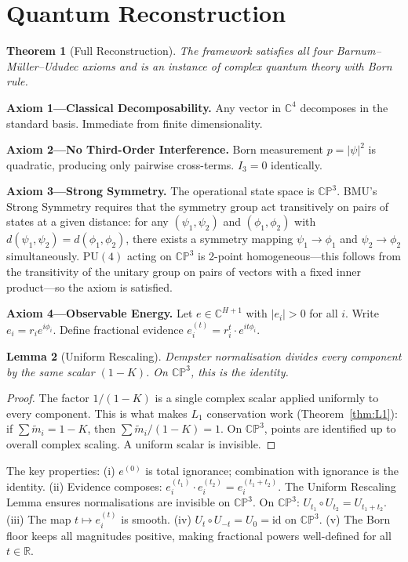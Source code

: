 \documentclass[11pt,a4paper]{article}
\newtheorem{theorem}{Theorem}[section]
\newtheorem{lemma}[theorem]{Lemma}
\theoremstyle{definition}
\theoremstyle{remark}
\newcommand{\CP}{\mathbb{CP}}
\newcommand{\C}{\mathbb{C}}
\newcommand{\R}{\mathbb{R}}
\begin{document}
\section{Quantum Reconstruction}\label{sec:BMU}

\begin{theorem}[Full Reconstruction]\label{thm:BMU}
The framework satisfies all four Barnum--M\"uller--Ududec axioms and is an instance of complex quantum theory with Born rule.
\end{theorem}

\textbf{Axiom 1---Classical Decomposability.} Any vector in $\C^4$ decomposes in the standard basis. Immediate from finite dimensionality.

\textbf{Axiom 2---No Third-Order Interference.} Born measurement $p=|\psi|^2$ is quadratic, producing only pairwise cross-terms. $I_3=0$ identically.

\textbf{Axiom 3---Strong Symmetry.} The operational state space is $\CP^3$. BMU's Strong Symmetry requires that the symmetry group act transitively on pairs of states at a given distance: for any $(\psi_1,\psi_2)$ and $(\phi_1,\phi_2)$ with $d(\psi_1,\psi_2)=d(\phi_1,\phi_2)$, there exists a symmetry mapping $\psi_1\to\phi_1$ and $\psi_2\to\phi_2$ simultaneously. $\mathrm{PU}(4)$ acting on $\CP^3$ is 2-point homogeneous---this follows from the transitivity of the unitary group on pairs of vectors with a fixed inner product---so the axiom is satisfied.

\textbf{Axiom 4---Observable Energy.} Let $e\in\C^{H+1}$ with $|e_i|>0$ for all $i$. Write $e_i=r_ie^{i\phi_i}$. Define fractional evidence $e^{(t)}_i=r^t_i\cdot e^{it\phi_i}$.

\begin{lemma}[Uniform Rescaling]\label{lem:uniform}
Dempster normalisation divides every component by the same scalar $(1-K)$. On $\CP^3$, this is the identity.
\end{lemma}

\begin{proof}
The factor $1/(1-K)$ is a single complex scalar applied uniformly to every component. This is what makes $L_1$ conservation work (Theorem~\ref{thm:L1}): if $\sum\tilde{m}_i=1-K$, then $\sum\tilde{m}_i/(1-K)=1$. On $\CP^3$, points are identified up to overall complex scaling. A uniform scalar is invisible.
\end{proof}

The key properties: (i) $e^{(0)}$ is total ignorance; combination with ignorance is the identity. (ii) Evidence composes: $e^{(t_1)}_i\cdot e^{(t_2)}_i=e^{(t_1+t_2)}_i$. The Uniform Rescaling Lemma ensures normalisations are invisible on $\CP^3$. On $\CP^3$: $U_{t_1}\circ U_{t_2}=U_{t_1+t_2}$. (iii) The map $t\mapsto e^{(t)}_i$ is smooth. (iv) $U_t\circ U_{-t}=U_0=\mathrm{id}$ on $\CP^3$. (v) The Born floor keeps all magnitudes positive, making fractional powers well-defined for all $t\in\R$.
\end{document}
